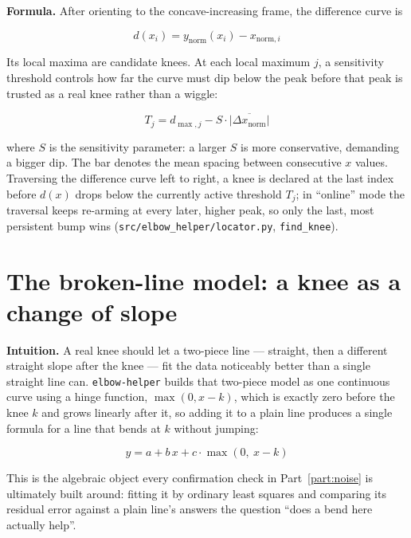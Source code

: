 \documentclass[11pt]{article}
\newcommand{\code}[1]{\texttt{#1}}
\begin{document}
\textbf{Formula.} After orienting to the concave-increasing frame, the
difference curve is

\begin{equation}
d(x_i) = y_{\text{norm}}(x_i) - x_{\text{norm}, i}
\end{equation}

Its local maxima are candidate knees. At each local maximum $j$, a
sensitivity threshold controls how far the curve must dip below the peak
before that peak is trusted as a real knee rather than a wiggle:

\begin{equation}
T_j = d_{\max, j} - S \cdot \overline{|\Delta x_{\text{norm}}|}
\end{equation}

where $S$ is the sensitivity parameter: a larger $S$ is more conservative,
demanding a bigger dip. The bar denotes the mean spacing between consecutive
$x$ values. Traversing the difference curve left to right, a knee is
declared at the last index before $d(x)$ drops below the currently active
threshold $T_j$; in ``online'' mode the traversal keeps re-arming at every
later, higher peak, so only the last, most persistent bump wins
(\code{src/elbow\_helper/locator.py}, \code{find\_knee}).

\section{The broken-line model: a knee as a change of slope}

\textbf{Intuition.} A real knee should let a two-piece line --- straight,
then a different straight slope after the knee --- fit the data noticeably
better than a single straight line can. \code{elbow-helper} builds that
two-piece model as one continuous curve using a hinge function, $\max(0, x -
k)$, which is exactly zero before the knee $k$ and grows linearly after it,
so adding it to a plain line produces a single formula for a line that
bends at $k$ without jumping:

\begin{equation}
y = a + b\,x + c \cdot \max(0,\ x - k)
\end{equation}

This is the algebraic object every confirmation check in
Part~\ref{part:noise} is ultimately built around: fitting it by ordinary
least squares and comparing its residual error against a plain line's
answers the question ``does a bend here actually help''.
\end{document}
